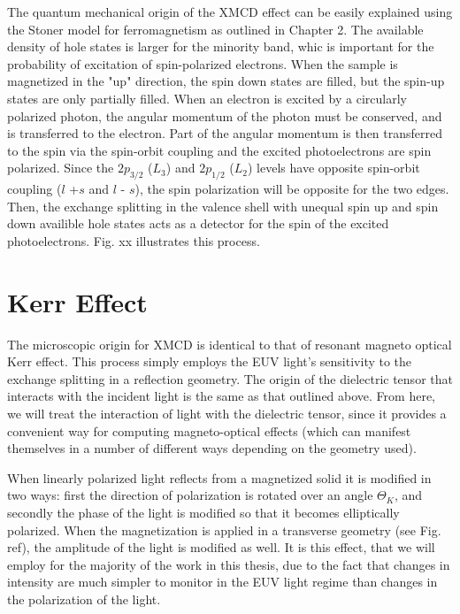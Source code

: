 The quantum mechanical origin of the XMCD effect can be easily explained using the Stoner model for ferromagnetism as outlined in Chapter 2. The available density of hole states is larger for the minority band, whic is important for the probability of excitation of spin-polarized electrons. When the sample is magnetized in the "up" direction, the spin down states are filled, but the spin-up states are only partially filled. When an electron is excited by a circularly polarized photon, the angular momentum of the photon must be conserved, and is transferred to the electron. Part of the angular momentum is then transferred to the spin via the spin-orbit coupling and the excited photoelectrons are spin polarized. Since the $2p_{3/2}$ ($L_3$) and $2p_{1/2}$ ($L_2$) levels have opposite spin-orbit coupling ($l$ +$s$ and $l$ - $s$), the spin polarization will be opposite for the two edges. Then, the exchange splitting in the valence shell with unequal spin up and spin down availible hole states acts as a detector for the spin of the excited photoelectrons. Fig. xx illustrates this process.

\section{Kerr Effect}

The microscopic origin for XMCD is identical to that of resonant magneto optical Kerr effect. This process simply employs the EUV light's sensitivity to the exchange splitting in a reflection geometry. The origin of the dielectric tensor that interacts with the incident light is the same as that outlined above. From here, we will treat the interaction of light with the dielectric tensor, since it provides a convenient way for computing magneto-optical effects (which can manifest themselves in a number of different ways depending on the geometry used).

When linearly polarized light reflects from a magnetized solid it is modified in two ways: first the direction of polarization is rotated over an angle $\Theta_K$, and secondly the phase of the light is modified so that it becomes elliptically polarized. When the magnetization is applied in a transverse geometry (see Fig. ref), the amplitude of the light is modified as well. It is this effect, that we will employ for the majority of the work in this thesis, due to the fact that changes in intensity are much simpler to monitor in the EUV light regime than changes in the polarization of the light.

